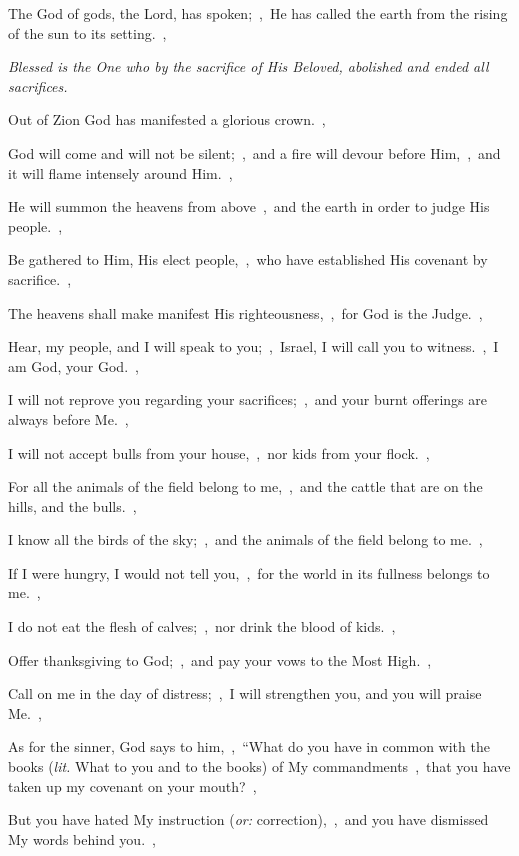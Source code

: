 \documentclass[12pt,twoside,a5paper]{article}
\newcommand{\qanona}[1]{{\liturgicalhint{Qanona.} \emph{#1}}}
\newcommand{\translationoption}[1]{\emph{or:} #1}
\newcommand{\translationliteral}[1]{\emph{lit.} #1}
\begin{document}
\begin{normalparskip}
  The God of gods, the Lord, has spoken;~\sep\ He has called the earth from the rising of the sun to its setting.~\sep

  \qanona{Blessed is the One who by the sacrifice of His Beloved, abolished and ended all sacrifices.}

  Out of Zion God has manifested a glorious crown.~\sep

  God will come and will not be silent;~\sep\ and a fire will devour before Him,~\sep\ and it will flame intensely around Him.~\sep

  He will summon the heavens from above~\sep\ and the earth in order to judge His people.~\sep

  Be gathered to Him, His elect people,~\sep\ who have established His covenant by sacrifice.~\sep

  The heavens shall make manifest His righteousness,~\sep\ for God is the Judge.~\sep

  Hear, my people, and I will speak to you;~\sep\ Israel, I will call you to witness.~\sep\ I am God, your God.~\sep

  I will not reprove you regarding your sacrifices;~\sep\ and your burnt offerings are always before Me.~\sep

  I will not accept bulls from your house,~\sep\ nor kids from your flock.~\sep

  For all the animals of the field belong to me,~\sep\ and the cattle that are on the hills, and the bulls.~\sep

  I know all the birds of the sky;~\sep\ and the animals of the field belong to me.~\sep

  If I were hungry, I would not tell you,~\sep\ for the world in its fullness belongs to me.~\sep

  I do not eat the flesh of calves;~\sep\ nor drink the blood of kids.~\sep

  Offer thanksgiving to God;~\sep\ and pay your vows to the Most High.~\sep

  Call on me in the day of distress;~\sep\ I will strengthen you, and you will praise Me.~\sep

  As for the sinner, God says to him,~\sep\ ``What do you have in common with the books (\translationliteral{What to you and to the books}) of My commandments~\sep\ that you have taken up my covenant on your mouth?~\sep

  But you have hated My instruction (\translationoption{correction}),~\sep\ and you have dismissed My words behind you.~\sep


\end{normalparskip}
\end{document}
